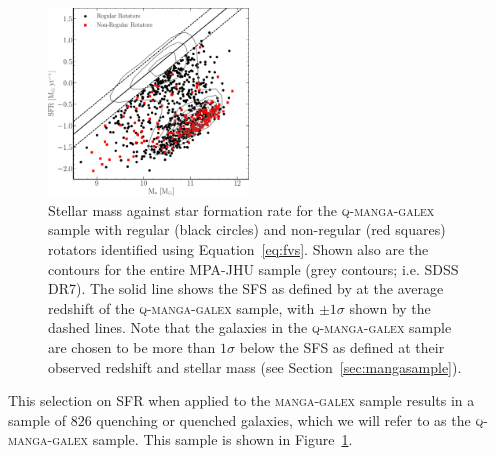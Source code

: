 \documentclass[useAMS,usenatbib]{mn2e}
\begin{document}
\begin{figure}
\centering
\includegraphics[width=0.475\textwidth]{../figures/MASS_SFR_FR_SR_VOR10_nonkdc.pdf}
\caption{Stellar mass against star formation rate for the \textsc{q-manga-galex} sample with regular (black circles) and non-regular (red squares) rotators identified using Equation~\ref{eq:fvs}. Shown also are the contours for the entire MPA-JHU sample (grey contours; i.e. SDSS DR7). The solid line shows the SFS as defined by \protect\cite{peng10} at the average redshift of the \textsc{q-manga-galex} sample, with $\pm 1 \sigma$ shown by the dashed lines. Note that the galaxies in the \textsc{q-manga-galex} sample are chosen to be more than $1\sigma$ below the SFS as defined at their observed redshift and stellar mass (see Section~\protect\ref{sec:mangasample}).}
\label{fig:masvsfr}
\end{figure}

This selection on SFR when applied to the \textsc{manga-galex} sample results in a sample of $826$ quenching or quenched galaxies, which we will refer to as the \textsc{q-manga-galex} sample. This sample is shown in Figure~\ref{fig:masvsfr}.

\end{document}
